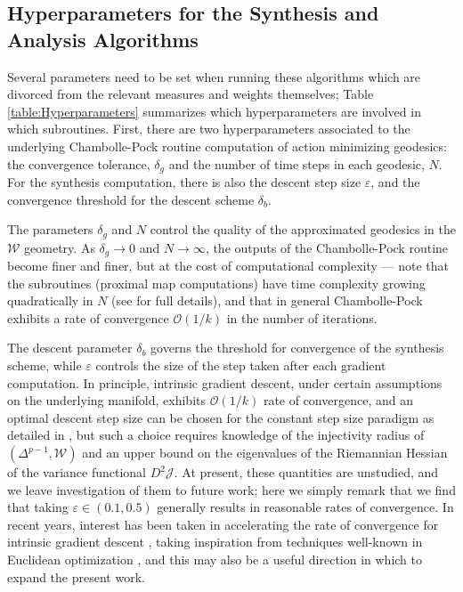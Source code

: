 \documentclass{article}
\newcommand{\J}{\mathcal{J}}
\newcommand{\W}{\mathcal{W}}
\begin{document}
\subsection{Hyperparameters for the Synthesis and Analysis Algorithms}
Several parameters need to be set when running these algorithms which are divorced from the relevant measures and weights themselves; Table \ref{table:Hyperparameters} summarizes which hyperparameters are involved in which subroutines. First, there are two hyperparameters associated to the underlying Chambolle-Pock routine computation of action minimizing geodesics: the convergence tolerance, \(\delta_g\) and the number of time steps in each geodesic, \(N\). For the synthesis computation, there is also the descent step size \(\varepsilon\), and the convergence threshold for the descent scheme \(\delta_b\).

The parameters \(\delta_g\) and \(N\) control the quality of the approximated geodesics in the \(\W\) geometry. As \(\delta_g \to 0\) and \(N \to \infty\), the outputs of the Chambolle-Pock routine become finer and finer, but at the cost of computational complexity --- note that the subroutines (proximal map computations) have time complexity growing quadratically in \(N\) (see \cite{erbarComputationOptimalTransport2020} for full details), and that in general Chambolle-Pock exhibits a rate of convergence \(\mathcal{O}(1/k)\) in the number of iterations. 

The descent parameter \(\delta_b\) governs the threshold for convergence of the synthesis scheme, while \(\varepsilon\) controls the size of the step taken after each gradient computation. In principle, intrinsic gradient descent, under certain assumptions on the underlying manifold, exhibits \(\mathcal{O}(1/k)\) rate of convergence, and an optimal descent step size can be chosen for the constant step size paradigm as detailed in \cite{afsariConvergenceGradientDescent2013}, but such a choice requires knowledge of the injectivity radius of \((\Delta^{p-1}, \W)\) and an upper bound on the eigenvalues of the Riemannian Hessian of the variance functional \(D^2\J\). At present, these quantities are unstudied, and we leave investigation of them to future work; here we simply remark that we find that taking \(\varepsilon \in (0.1, 0.5)\) generally results in reasonable rates of convergence. In recent years, interest has been taken in accelerating the rate of convergence for intrinsic gradient descent \cite{alimisisMomentumImprovesOptimization2021}, taking inspiration from techniques well-known in Euclidean optimization \cite{polyak1987introduction}, and this may also be a useful direction in which to expand the present work.
\end{document}
